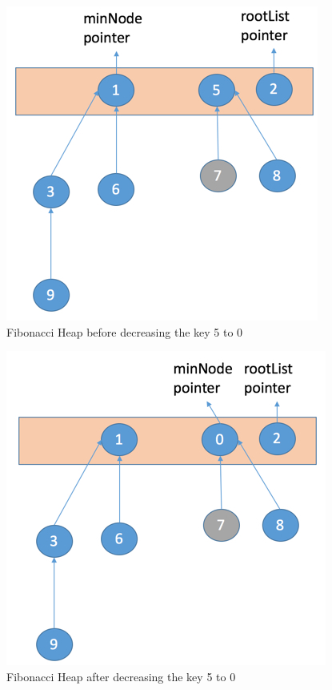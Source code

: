 \begin{figure}[h]
	\includegraphics[width=0.95\columnwidth,height=0.75\columnwidth]{Figures/FibonacciHeapDecreaseKeyNoVilolation1Operation}
	\caption{Fibonacci Heap before decreasing the key 5 to 0}
	\label {fig:decreaseKey1NoViolation}
\end{figure}
\begin{figure}[h]
	\includegraphics[width=0.95\columnwidth,height=0.75\columnwidth]{Figures/FibonacciHeapDecreaseKeyNoVilolation2Operation}
	\caption{Fibonacci Heap after decreasing the key 5 to 0}
	\label {fig:decreaseKey2NoViolation}
\end{figure}
